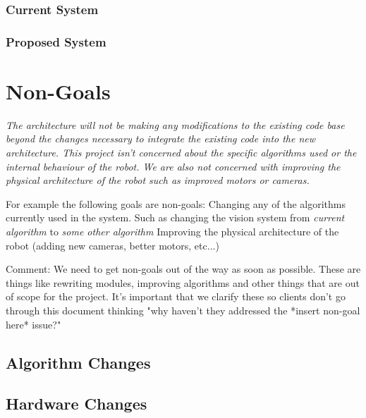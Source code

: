 \documentclass[english,12pt]{scrartcl}
\begin{document}
            \subsubsection{Current System}
            \subsubsection{Proposed System}
        
    \section{Non-Goals}
    	{
		\em %
        The architecture will not be making any modifications to the existing code base beyond the
        changes necessary to integrate the existing code into the new architecture. This project
        isn't concerned about the specific algorithms used or the internal behaviour of the robot.
        We are also not concerned with improving the physical architecture of the robot such as
        improved motors or cameras.
    
        For example the following goals are non-goals:
        Changing any of the algorithms currently used in the system. Such as changing the vision
        system from \emph{current algorithm} to \emph{some other algorithm} Improving the physical
        architecture of the robot (adding new cameras, better motors, etc...)
        
        Comment: We need to get non-goals out of the way as soon as possible. These are things like
        rewriting modules, improving algorithms and other things that are out of scope for the
        project. It's important that we clarify these so clients don't go through this document
        thinking "why haven't they addressed the *insert non-goal here* issue?"
        }
        
        \subsection{Algorithm Changes}
            
        \subsection{Hardware Changes}
        
\end{document}
